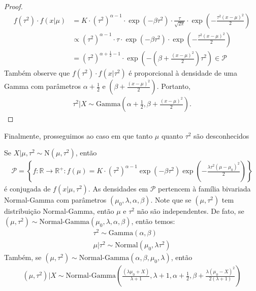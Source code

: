\begin{proof}
 \begin{align*}
  f(\tau^{2}) \cdot f(x|\mu)
  &= K \cdot \left(\tau^{2}\right)^{\alpha-1} \cdot \exp(-\beta \tau^{2}) \cdot \frac{\tau}{\sqrt{2\pi}} \cdot \exp\left(-\frac{\tau^{2}(x-\mu)^{2}}{2}\right)
  \nonumber \\
  &\propto \left(\tau^{2}\right)^{\alpha-1} \cdot \tau \cdot \exp(-\beta \tau^{2}) \cdot \exp\left(-\frac{\tau^{2}(x-\mu)^{2}}{2}\right) \\
  &= \left(\tau^{2}\right)^{\alpha+\frac{1}{2}-1} \cdot \exp\left(-\left(\beta+\frac{(x-\mu)^{2}}{2}\right)\tau^{2}\right) \in \mathcal{P}
 \end{align*}
 Também observe que $f(\tau^{2}) \cdot f(x|\tau^{2})$ é
 proporcional à densidade de uma Gamma com parâmetros
 $\alpha+\frac{1}{2}$ e
 $\left(\beta+\frac{(x-\mu)^{2}}{2}\right)$. Portanto,
 \begin{align*}
  \tau^{2}|X \sim \text{Gamma}\left(\alpha+\frac{1}{2},
  \beta+\frac{(x-\mu)^{2}}{2}\right).
 \end{align*}
\end{proof}

Finalmente, prosseguimos ao caso em que
tanto $\mu$ quanto $\tau^{2}$ são desconhecidos
\begin{lemma}
 \label{lemma:conjugate_normal_mean_precision}
 Se $X|\mu,\tau^{2} \sim \text{N}(\mu,\tau^{2})$,
 então
 \begin{align*}
  \mathcal{P} = \left\{f: \mathbb{R} \rightarrow \mathbb{R}^{+}: f(\mu) = K \cdot (\tau^{2})^{\alpha-1}\exp(-\beta \tau^{2})\exp\left(-\frac{\lambda\tau^{2}(\mu-\mu_{0})^{2}}{2}\right)\right\}
 \end{align*}
 é conjugada de $f(x|\mu,\tau^{2})$.
 As densidades em $\mathcal{P}$ pertencem à
 família bivariada Normal-Gamma com parâmetros
 $(\mu_{0},\lambda,\alpha,\beta)$. Note que se 
 $(\mu,\tau^{2})$ tem distribuição Normal-Gamma,
 então $\mu$ e $\tau^{2}$ não são independentes.
 De fato, se $(\mu,\tau^{2}) \sim \text{Normal-Gamma}(\mu_{0},\lambda,\alpha,\beta)$, então temos:
 \begin{align*}
  \tau^{2} \sim \text{Gamma}(\alpha, \beta) \\
  \mu|\tau^{2} \sim \text{Normal}(\mu_{0},\lambda \tau^{2})
 \end{align*}
 Também, se $(\mu,\tau^{2}) \sim \text{Normal-Gamma}(\alpha,\beta,\mu_{0},\lambda)$, então
 \begin{align*}
  (\mu,\tau^{2})|X \sim \text{Normal-Gamma}\left(\frac{(\lambda\mu_{0}+X)}{\lambda+1}, \lambda+1, \alpha+\frac{1}{2}, \beta + \frac{\lambda(\mu_{0}-X)^{2}}{2(\lambda+1)} \right)
 \end{align*}
\end{lemma}

